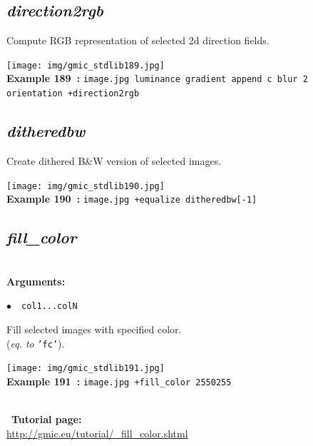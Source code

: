 \documentclass[a4paper,10.5pt,twoside]{book}
\def\comma{\discretionary{,}{}{,}}
\newcommand{\Cb}[1]{\textcolor{cb}{#1}}
\begin{document}
\subsection{\emph{direction2rgb} }\vspace*{-0.7em}
Compute RGB representation of selected 2d direction fields.
\begin{center}\texttt{[image: img/gmic\_stdlib189.jpg]}\\
{\footnotesize \textbf{Example 189~:} \texttt{image.jpg luminance gradient append c blur 2 orientation +direction2rgb}}
\end{center}

\subsection{\emph{ditheredbw} }\vspace*{-0.7em}
Create dithered B\&W version of selected images.
\begin{center}\texttt{[image: img/gmic\_stdlib190.jpg]}\\
{\footnotesize \textbf{Example 190~:} \texttt{image.jpg +equalize ditheredbw[-1]}}
\end{center}

\subsection{\emph{fill\_color} }\vspace*{-0.7em}
~\\\textbf{\Cb{Arguments: }}\begin{flushleft}
{\small \Cb{\hspace*{0.5cm}$\bullet$~~\texttt{col1{\comma}...{\comma}colN}}}\end{flushleft}
Fill selected images with specified color.
~\\(\emph{eq. to} {\small \texttt{'fc'}}).
\begin{center}\texttt{[image: img/gmic\_stdlib191.jpg]}\\
{\footnotesize \textbf{Example 191~:} \texttt{image.jpg +fill\_color 255{\comma}0{\comma}255}}
\end{center}
~\\
~\textbf{Tutorial page: }\\\url{http://gmic.eu/tutorial/\_fill\_color.shtml}
\end{document}
